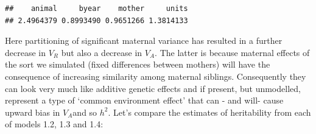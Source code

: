 \documentclass[
  12pt,
]{book}
\newenvironment{Shaded}{\begin{snugshade}}{\end{snugshade}}
\newcommand{\AttributeTok}[1]{\textcolor[rgb]{0.77,0.63,0.00}{#1}}
\newcommand{\ConstantTok}[1]{\textcolor[rgb]{0.00,0.00,0.00}{#1}}
\newcommand{\DecValTok}[1]{\textcolor[rgb]{0.00,0.00,0.81}{#1}}
\newcommand{\FloatTok}[1]{\textcolor[rgb]{0.00,0.00,0.81}{#1}}
\newcommand{\FunctionTok}[1]{\textcolor[rgb]{0.00,0.00,0.00}{#1}}
\newcommand{\NormalTok}[1]{#1}
\newcommand{\OtherTok}[1]{\textcolor[rgb]{0.56,0.35,0.01}{#1}}
\newcommand{\SpecialCharTok}[1]{\textcolor[rgb]{0.00,0.00,0.00}{#1}}
\begin{document}
\begin{Shaded}
\end{Shaded}

\begin{verbatim}
##    animal     byear    mother     units 
## 2.4964379 0.8993490 0.9651266 1.3814133
\end{verbatim}

Here partitioning of significant maternal variance has resulted in a further decrease in \(V_R\) but also a decrease in \(V_A\). The latter is because maternal effects of the sort we simulated (fixed differences between mothers) will have the consequence of increasing similarity among maternal siblings. Consequently they can look very much like additive genetic effects and if present, but unmodelled, represent a type of `common environment effect' that can - and will- cause upward bias in \(V_A\)and so \(h^2\). Let's compare the estimates of heritability from each of models 1.2, 1.3 and 1.4:
\end{document}
